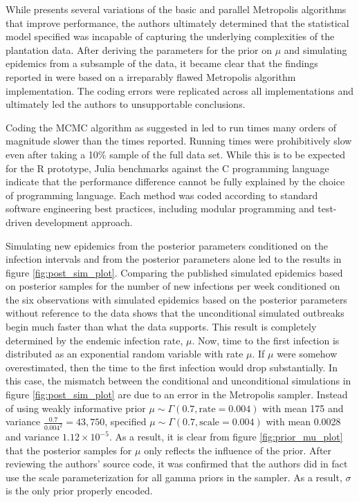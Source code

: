 \documentclass{uwstat572}
\begin{document}
While \citet{Brown} presents several variations of the basic and parallel Metropolis algorithms that improve performance, the authors ultimately determined that the statistical model specified was incapable of capturing the underlying complexities of the plantation data. 
After deriving the parameters for the prior on $\mu$ and simulating epidemics from a subsample of the data, it became clear that the findings reported in \citet{Brown} were based on a irreparably flawed Metropolis algorithm implementation. 
The coding errors were replicated across all implementations and ultimately led the authors to unsupportable conclusions.

Coding the MCMC algorithm as suggested in \citet{Brown} led to run times many orders of magnitude slower than the times reported. 
Running times were prohibitively slow even after taking a 10\% sample of the full data set. 
While this is to be expected for the R prototype, Julia benchmarks against the C programming language indicate that the performance difference cannot be fully explained by the choice of programming language. 
Each method was coded according to standard software engineering best practices, including modular programming and test-driven development approach.  

Simulating new epidemics from the posterior parameters conditioned on the infection intervals and from the posterior parameters alone led \citet{Brown} to the results in figure \ref{fig:post_sim_plot}. 
Comparing the published simulated epidemics based on posterior samples for the number of new infections per week conditioned on the six observations with simulated epidemics based on the posterior parameters without reference to the data shows that the unconditional simulated outbreaks begin much faster than what the data supports. 
This result is completely determined by the endemic infection rate, $\mu$. 
Now, time to the first infection is distributed as an exponential random variable with rate $\mu$. 
If $\mu$ were somehow overestimated, then the time to the first infection would drop substantially.
In this case, the mismatch between the conditional and unconditional simulations in figure \ref{fig:post_sim_plot} are due to an error in the Metropolis sampler. 
Instead of using weakly informative prior $\mu \sim \Gamma(0.7, \text{rate}=0.004)$ with mean 175 and variance $\frac{0.7}{0.004^2}=43,750$, \citep{Brown} specified $\mu \sim \Gamma(0.7, \text{scale}=0.004)$ with mean 0.0028 and variance $1.12\times10^{-5}$. 
As a result, it is clear from figure \ref{fig:prior_mu_plot} that the posterior samples for $\mu$ only reflects the influence of the prior. 
After reviewing the authors' source code, it was confirmed that the authors did in fact use the scale parameterization for all gamma priors in the sampler. 
As a result, $\sigma$ is the only prior properly encoded. 
\end{document}
